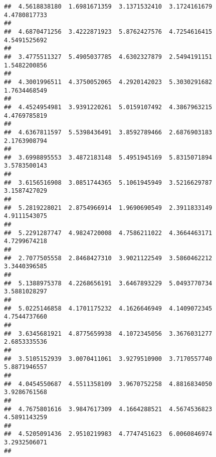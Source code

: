 \documentclass[]{article}
\begin{document}
\begin{verbatim}
##  4.5618838180  1.6981671359  3.1371532410  3.1724161679  4.4780817733 
##                                                                       
##  4.6870471256  3.4222871923  5.8762427576  4.7254616415  4.5491525692 
##                                                                       
##  3.4775511327  5.4905037785  4.6302327879  2.5494191151  1.5482200856 
##                                                                       
##  4.3001996511  4.3750052065  4.2920142023  5.3030291682  1.7634468549 
##                                                                       
##  4.4524954981  3.9391220261  5.0159107492  4.3867963215  4.4769785819 
##                                                                       
##  4.6367811597  5.5398436491  3.8592789466  2.6876903183  2.1763908794 
##                                                                       
##  3.6998895553  3.4872183148  5.4951945169  5.8315071894  3.5783500143 
##                                                                       
##  3.6156516908  3.0851744365  5.1061945949  3.5216629787  3.1587427029 
##                                                                       
##  5.2819228021  2.8754966914  1.9690690549  2.3911833149  4.9111543075 
##                                                                       
##  5.2291287747  4.9824720008  4.7586211022  4.3664463171  4.7299674218 
##                                                                       
##  2.7077505558  2.8468427310  3.9021122549  3.5860462212  3.3440396585 
##                                                                       
##  5.1388975378  4.2268656191  3.6467893229  5.0493770734  3.5881028297 
##                                                                       
##  5.0225146858  4.1701175232  4.1626646949  4.1409072345  4.7544737660 
##                                                                       
##  3.6345681921  4.8775659938  4.1072345056  3.3676031277  2.6853335536 
##                                                                       
##  3.5105152939  3.0070411061  3.9279510900  3.7170557740  5.8871946557 
##                                                                       
##  4.0454550687  4.5511358109  3.9670752258  4.8816834050  3.9286761568 
##                                                                       
##  4.7675801616  3.9847617309  4.1664288521  4.5674536823  4.5891143259 
##                                                                       
##  4.5205091436  2.9510219983  4.7747451623  6.0060846974  3.2932506071 
##                                                                       

\end{verbatim}
\end{document}
